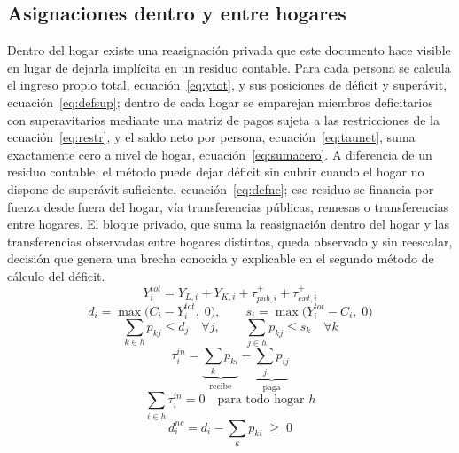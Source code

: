 \documentclass[11pt,a4paper]{article}
\begin{document}
\subsection{Asignaciones dentro y entre hogares}
Dentro del hogar existe una reasignación privada que este documento hace visible en lugar de
dejarla implícita en un residuo contable. Para cada persona se calcula el ingreso propio total,
ecuación~\eqref{eq:ytot}, y sus posiciones de déficit y superávit, ecuación~\eqref{eq:defsup};
dentro de cada hogar se emparejan miembros deficitarios con superavitarios mediante una matriz de
pagos sujeta a las restricciones de la ecuación~\eqref{eq:restr}, y el saldo neto por persona,
ecuación~\eqref{eq:taunet}, suma exactamente cero a nivel de hogar, ecuación~\eqref{eq:sumacero}.
A diferencia de un residuo contable, el método puede dejar déficit sin cubrir cuando el hogar no
dispone de superávit suficiente, ecuación~\eqref{eq:defnc}; ese residuo se financia por fuerza
desde fuera del hogar, vía transferencias públicas, remesas o transferencias entre hogares. El
bloque privado, que suma la reasignación dentro del hogar y las transferencias observadas entre
hogares distintos, queda observado y sin reescalar, decisión que genera una brecha conocida y
explicable en el segundo método de cálculo del déficit.
\begin{equation}
\label{eq:ytot}
Y^{tot}_i = Y_{L,i} + Y_{K,i} + \tau^{+}_{pub,i} + \tau^{+}_{ext,i}
\end{equation}
\begin{equation}
\label{eq:defsup}
d_i = \max\big(C_i - Y^{tot}_i,\; 0\big),
\qquad
s_i = \max\big(Y^{tot}_i - C_i,\; 0\big)
\end{equation}
\begin{equation}
\label{eq:restr}
\sum_{k \in h} p_{kj} \le d_j \quad \forall j,
\qquad
\sum_{j \in h} p_{kj} \le s_k \quad \forall k
\end{equation}
\begin{equation}
\label{eq:taunet}
\tau^{in}_i = \underbrace{\sum_{k} p_{ki}}_{\text{recibe}}
- \underbrace{\sum_{j} p_{ij}}_{\text{paga}}
\end{equation}
\begin{equation}
\label{eq:sumacero}
\sum_{i \in h} \tau^{in}_i = 0 \quad \text{para todo hogar } h
\end{equation}
\begin{equation}
\label{eq:defnc}
d^{nc}_i = d_i - \sum_k p_{ki} \; \ge \; 0
\end{equation}
\end{document}

